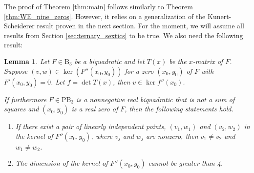 \documentclass[a4paper]{article}
\numberwithin{equation}{section}
\newtheorem{lemma}[theorem]{Lemma}
\theoremstyle{definition}
\theoremstyle{remark}
\begin{document}
The proof of Theorem \ref{thm:main} follows similarly to Theorem \ref{thm:WE_nine_zeros}.  However, it relies on a generalization of the Kunert-Scheiderer result proven in the next section.  For the moment, we will assume all results from Section \ref{sec:ternary_sextics} to be true. We also need the following result:

\begin{lemma}\label{lem:roots}
Let $F \in \mathrm{B}_3$ be a biquadratic and let $T(x)$ be the $x$-matrix of $F$.  Suppose $(v,w) \in \ker(F''(x_0,y_0))$ for a zero $(x_0,y_0)$ of $F$ with $F'(x_0,y_0) = 0$. Let $f = \det T(x)$, then $v \in \ker f''(x_0)$.

If furthermore $F \in \mathrm{PB}_3$ is a nonnegative real biquadratic that is not a sum of squares and $(x_0,y_0)$ is a real zero of $F$, then the following statements hold.
\begin{enumerate}
    \item If there exist a pair of linearly independent points, $(v_1,w_1)$ and $(v_2,w_2)$ in the kernel of $F''(x_0,y_0)$, where $v_j$ and $w_j$ are nonzero, then $v_1 \neq v_2$ and $w_1 \neq w_2$.
    \item The dimension of the kernel of $F''(x_0,y_0)$ cannot be greater than 4.
\end{enumerate}
\end{lemma}
\end{document}
